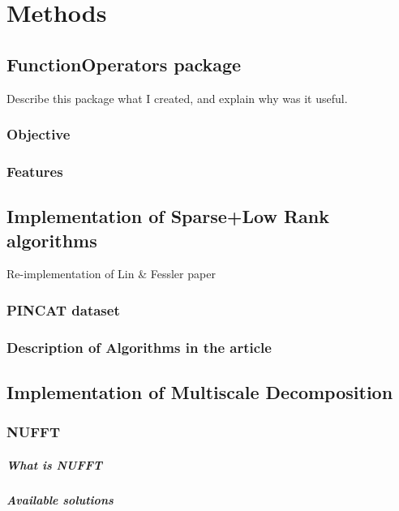 \chapter{Methods}

\section{FunctionOperators package}
Describe this package what I created, and explain why was it useful.
\subsection{Objective}
\subsection{Features}

\section{Implementation of Sparse+Low Rank algorithms}
Re-implementation of Lin \& Fessler paper
\subsection{PINCAT dataset}
\subsection{Description of Algorithms in the article}

\section{Implementation of Multiscale Decomposition}

\subsection{NUFFT}
\paragraph{What is NUFFT}
\paragraph{Available solutions}
